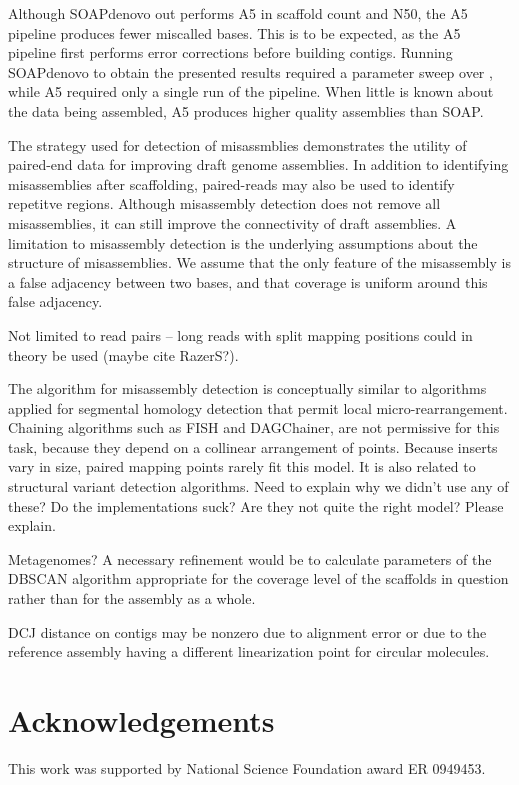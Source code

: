 \documentclass{bioinfo}
\begin{document}
Although SOAPdenovo out performs A5 in scaffold count and N50, the A5 pipeline produces fewer miscalled bases. This is to
be expected, as the A5 pipeline first performs error corrections before building contigs. Running SOAPdenovo to
obtain the presented results required a parameter sweep over , while A5 required
only a single run of the pipeline. When little is known about the data being assembled, A5 produces higher quality assemblies 
than SOAP.

The strategy used for detection of misassmblies demonstrates the utility of paired-end data for improving draft genome assemblies.
In addition to identifying misassemblies after scaffolding, paired-reads may also be used to identify repetitve regions.   
Although misassembly detection does not remove all misassemblies, it can still improve the connectivity of draft assemblies.
A limitation to misassembly detection is the underlying assumptions about the structure of misassemblies. We assume that the only
feature of the misassembly is a false adjacency between two bases, and that coverage is uniform around this false adjacency. 

Not limited to read pairs -- long reads with split mapping positions could in theory be used (maybe cite RazerS?).

The algorithm for misassembly detection is conceptually similar to algorithms applied for segmental homology detection that permit local micro-rearrangement. Chaining algorithms such as FISH and DAGChainer, are not permissive for this task, because they depend on a collinear arrangement of points. Because inserts vary in size, paired mapping points rarely fit this model.  It is also related to structural variant detection algorithms. Need to explain why we didn't use any of these?  Do the implementations suck? Are they not quite the right model? Please explain.


Metagenomes? A necessary refinement would be to calculate parameters of the DBSCAN algorithm appropriate for the coverage level of the 
scaffolds in question rather than for the assembly as a whole.

DCJ distance on contigs may be nonzero due to alignment error or due to the reference assembly having a different linearization point
for circular molecules. 

\section*{Acknowledgements}
This work was supported by National Science Foundation award ER 0949453.
\end{document}
